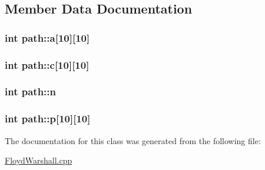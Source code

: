 \subsection{Member Data Documentation}
\subsubsection[{\texorpdfstring{a}{a}}]{\setlength{\rightskip}{0pt plus 5cm}int path\+::a\mbox{[}10\mbox{]}\mbox{[}10\mbox{]}\hspace{0.3cm}{\ttfamily [private]}}\hypertarget{classpath_a73755051d4f15dd918791bc11b776521}{}\label{classpath_a73755051d4f15dd918791bc11b776521}
\subsubsection[{\texorpdfstring{c}{c}}]{\setlength{\rightskip}{0pt plus 5cm}int path\+::c\mbox{[}10\mbox{]}\mbox{[}10\mbox{]}\hspace{0.3cm}{\ttfamily [private]}}\hypertarget{classpath_a44e02858ba6e199f35611952bd5e42db}{}\label{classpath_a44e02858ba6e199f35611952bd5e42db}
\subsubsection[{\texorpdfstring{n}{n}}]{\setlength{\rightskip}{0pt plus 5cm}int path\+::n\hspace{0.3cm}{\ttfamily [private]}}\hypertarget{classpath_a4c3e3313530b46fb13cd4b5163b03cb0}{}\label{classpath_a4c3e3313530b46fb13cd4b5163b03cb0}
\subsubsection[{\texorpdfstring{p}{p}}]{\setlength{\rightskip}{0pt plus 5cm}int path\+::p\mbox{[}10\mbox{]}\mbox{[}10\mbox{]}\hspace{0.3cm}{\ttfamily [private]}}\hypertarget{classpath_a74b571902c8e9e488f7bcc38630f0652}{}\label{classpath_a74b571902c8e9e488f7bcc38630f0652}


The documentation for this class was generated from the following file\+:\begin{DoxyCompactItemize}
\item 
\hyperlink{FloydWarshall_8cpp}{Floyd\+Warshall.\+cpp}\end{DoxyCompactItemize}

